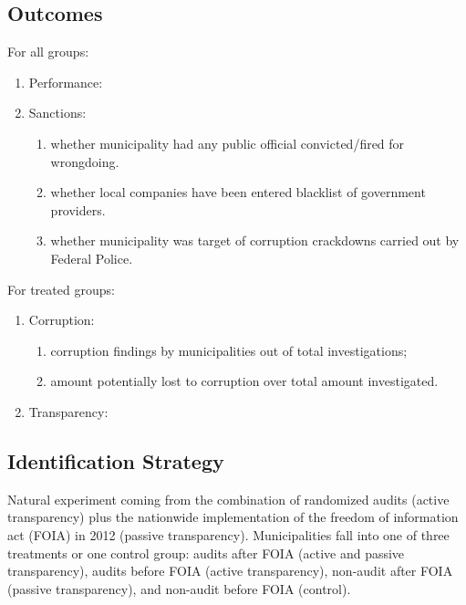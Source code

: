 \documentclass[]{article}
\begin{document}
\hypertarget{outcomes}{%
\subsection{Outcomes}\label{outcomes}}

For all groups:

\begin{enumerate}
\item
  Performance:
\item
  Sanctions:

  \begin{enumerate}
  \item
    whether municipality had any public official convicted/fired for
    wrongdoing.
  \item
    whether local companies have been entered blacklist of government
    providers.
  \item
    whether municipality was target of corruption crackdowns carried out
    by Federal Police.
  \end{enumerate}
\end{enumerate}

For treated groups:

\begin{enumerate}
\item
  Corruption:

  \begin{enumerate}
  \item
    corruption findings by municipalities out of total investigations;
  \item
    amount potentially lost to corruption over total amount
    investigated.
  \end{enumerate}
\item
  Transparency:
\end{enumerate}

\hypertarget{identification-strategy}{%
\subsection{Identification Strategy}\label{identification-strategy}}

Natural experiment coming from the combination of randomized audits
(active transparency) plus the nationwide implementation of the freedom
of information act (FOIA) in 2012 (passive transparency). Municipalities
fall into one of three treatments or one control group: audits after
FOIA (active and passive transparency), audits before FOIA (active
transparency), non-audit after FOIA (passive transparency), and
non-audit before FOIA (control).
\end{document}
